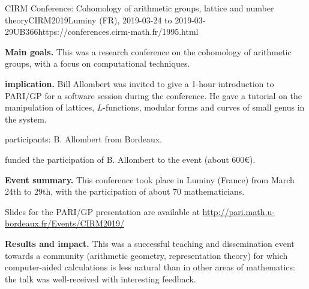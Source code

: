 \begin{event}{CIRM Conference: Cohomology of arithmetic groups, lattice and number
  theory}{CIRM2019}{Luminy (FR),
  2019-03-24 to
  2019-03-29}{UB}{36}{6}{https://conferences.cirm-math.fr/1995.html}
  
\textbf{Main goals.} This was a research conference on the cohomology of
arithmetic groups, with a focus on computational techniques.

\textbf{\ODK implication.} Bill Allombert was invited to give a 1-hour
introduction to PARI/GP for a software session during the conference.
He gave a tutorial on the manipulation of lattices, $L$-functions,
modular forms and curves of small genus in the system.

\ODK participants: B. Allombert from Bordeaux.

\ODK funded the participation of B. Allombert to the event (about 600\euro).

\textbf{Event summary.} This conference took place in Luminy (France)
from March 24th to 29th, with the participation of about 70 mathematicians.

Slides for the PARI/GP presentation are available at
\url{http://pari.math.u-bordeaux.fr/Events/CIRM2019/}

\textbf{Results and impact.} This was a successful teaching and dissemination
event towards a community (arithmetic geometry, representation theory)
for which computer-aided calculations is less natural than in other
areas of mathematics: the talk was well-received with interesting
feedback.
\end{event}

